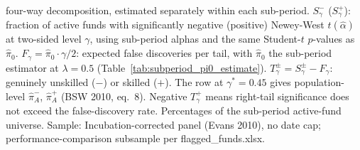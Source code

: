 \begin{table}[!htbp]
\begin{minipage}{\tabletempwidth}
\ifdim\wd\tabletempbox>\linewidth
  \resizebox{\linewidth}{!}{\usebox{\tabletempbox}}
\else
  \usebox{\tabletempbox}
\fi
\par\medskip
\begin{singlespace}\tablefont\noindent
\textcite{BarrasScailletWermers2010} four-way decomposition, estimated separately within each sub-period. $S^-_\gamma$ ($S^+_\gamma$): fraction of active funds with significantly negative (positive) Newey-West $t(\hat{\alpha})$ at two-sided level $\gamma$, using sub-period \textcite{Carhart1997} alphas and the same Student-$t$ $p$-values as $\hat{\pi}_0$. $F_\gamma = \hat{\pi}_0 \cdot \gamma/2$: expected false discoveries per tail, with $\hat{\pi}_0$ the sub-period \textcite{Storey2002} estimator at $\lambda = 0.5$ (Table~\ref{tab:subperiod_pi0_estimate}). $T^\pm_\gamma = S^\pm_\gamma - F_\gamma$: genuinely unskilled ($-$) or skilled ($+$). The row at $\gamma^* = 0.45$ gives population-level $\hat{\pi}^-_A$, $\hat{\pi}^+_A$ (BSW 2010, eq.~8). Negative $T^+_\gamma$ means right-tail significance does not exceed the false-discovery rate. Percentages of the sub-period active-fund universe. Sample: Incubation-corrected panel (Evans 2010), no date cap; performance-comparison subsample per flagged\_funds.xlsx.
\end{singlespace}
\end{minipage}
\end{table}

